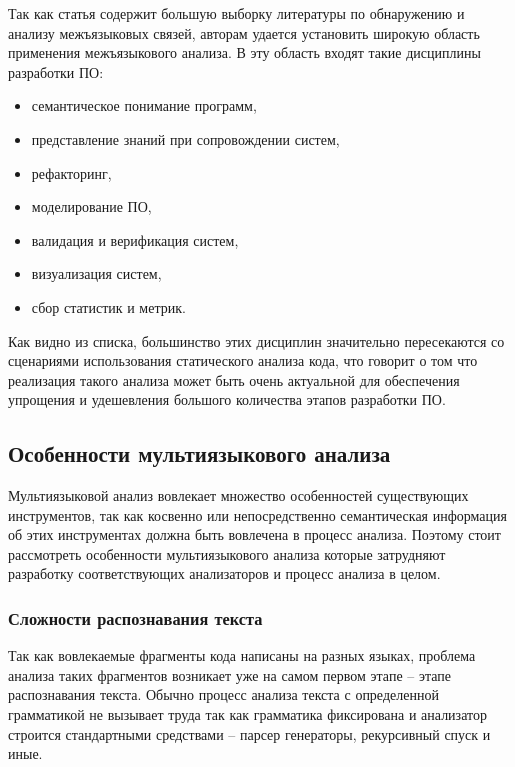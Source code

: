 Так как статья содержит большую выборку литературы по обнаружению и анализу межъязыковых связей, авторам удается
установить широкую область применения межъязыкового анализа. В эту область входят такие дисциплины разработки ПО:
\begin{itemize}
    \item семантическое понимание программ,
    \item представление знаний при сопровождении систем,
    \item рефакторинг,
    \item моделирование ПО,
    \item валидация и верификация систем,
    \item визуализация систем,
    \item сбор статистик и метрик.
\end{itemize}
Как видно из списка, большинство этих дисциплин значительно пересекаются со сценариями использования
статического анализа кода, что говорит о том что реализация такого анализа может быть очень актуальной
для обеспечения упрощения и удешевления большого количества этапов разработки ПО.

\subsection{Особенности мультиязыкового анализа} \label{ssec:num1}

Мультиязыковой анализ вовлекает множество особенностей существующих инструментов, так как косвенно или
непосредственно семантическая информация об этих инструментах должна быть вовлечена в процесс анализа.
Поэтому стоит рассмотреть особенности мультиязыкового анализа которые затрудняют разработку соответствующих
анализаторов и процесс анализа в целом.

\subsubsection{Сложности распознавания текста}

Так как вовлекаемые фрагменты кода написаны на разных языках, проблема анализа таких фрагментов
возникает уже на самом первом этапе -- этапе распознавания текста. Обычно процесс анализа
текста с определенной грамматикой не вызывает труда так как грамматика фиксирована и анализатор строится
стандартными средствами -- парсер генераторы, рекурсивный спуск и иные. 

